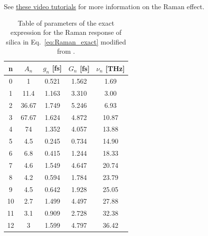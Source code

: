 See \href{https://www.youtube.com/playlist?list=PLdFybGSAoPnn6tnSmptR71zKAgcKsjIfi}{these video tutorials} for more information on the Raman effect.   

\begin{table}
\begin{center}
    \begin{tabular}{c|c|c|c|c}
    \label{tab:raman_coeffs}
        n  &$A_n$ & $g_n$ [fs] & $G_n$ [fs] & $\nu_n$ [THz]  \\ \hline
        0  &  1    &0.521       &1.562          &1.69   \\
        1  &  11.4 &1.163       &3.310          &3.00   \\
        2  &  36.67&1.749       &5.246          &6.93   \\
        3  &  67.67&1.624       &4.872          &10.87\\
        4  &  74   &1.352       &4.057          &13.88       \\
        5  &  4.5  &0.245       &0.734          & 14.90   \\
        6  &  6.8  &0.415       &1.244          & 18.33   \\
        7  &  4.6  &1.549       &4.647          & 20.74   \\
        8  &  4.2  &0.594       &1.784          & 23.79  \\
        9  &  4.5  &0.642       &1.928          & 25.05   \\
        10 &  2.7  &1.499       &4.497          & 27.88   \\
        11 &  3.1  &0.909       &2.728          & 32.38   \\
        12 &  3    &1.599       &4.797          &   36.42 
    \end{tabular}
    \caption{Table of parameters of the exact expression for the Raman response of silica in Eq.~\ref{eq:Raman_exact} modified from \cite{raman_exact}.  }
    \end{center}
\end{table}

